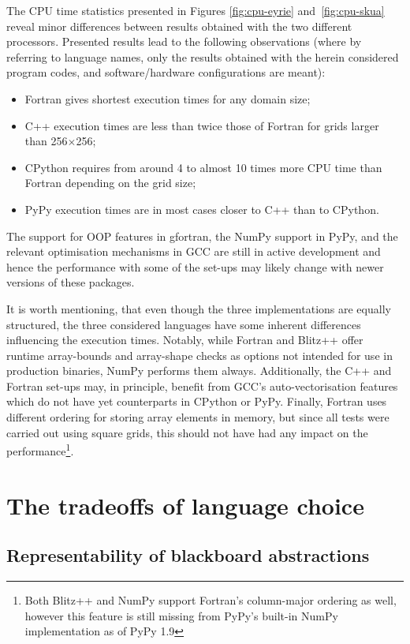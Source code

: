 \documentclass[twocolumn]{article}
\begin{document}
  The CPU time statistics presented in Figures \ref{fig:cpu-eyrie} and~\ref{fig:cpu-skua} reveal
    minor differences between results obtained with the two different processors.
  Presented results lead to the following observations
    (where by referring to language names, only the results obtained with the herein considered
     program codes, and software/hardware configurations are meant):
  \begin{itemize}
    \item{Fortran gives shortest execution times for any domain size;}
    \item{C++ execution times are less than twice those of Fortran for grids larger than 
      256$\times$256;}
    \item{CPython requires from around 4 to almost 10 times more CPU time than Fortran depending on the grid size;}
    \item{PyPy execution times are in most cases closer to C++ than to CPython.}
  \end{itemize}
  The support for OOP features in gfortran, the NumPy support in PyPy, and the relevant optimisation
    mechanisms in GCC are still in active development and hence the performance with some of the set-ups may 
    likely change with newer versions of these packages. 

  It is worth mentioning, that even though the three implementations are equally structured,
    the three considered languages have some inherent differences influencing the execution times.
  Notably, while Fortran and Blitz++ offer runtime array-bounds and array-shape checks as options
    not intended for use in production binaries, NumPy performs them always.
  Additionally, the C++ and Fortran set-ups may, in principle, benefit from GCC's auto-vectorisation
    features which do not have yet counterparts in CPython or PyPy.
  Finally, Fortran uses different ordering for storing array elements in memory, but since
    all tests were carried out using square grids, this should not have had any impact on the
    performance\footnote{Both Blitz++ and NumPy support Fortran's column-major ordering as well, 
    however this feature is still missing from PyPy's built-in NumPy implementation as of PyPy 1.9}.

  \section{The tradeoffs of language choice}\label{sec:tradeoffs}

  \subsection{Representability of blackboard abstractions}
\end{document}
